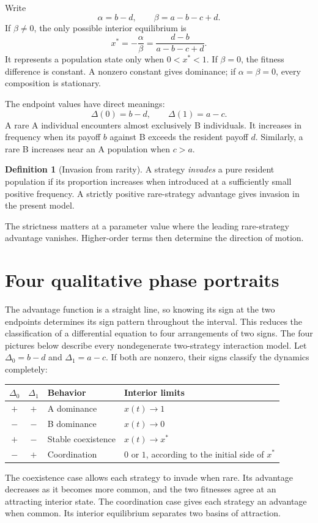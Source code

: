 \documentclass[11pt,oneside,openany]{book}
\theoremstyle{definition}
\newtheorem{definition}[theorem]{Definition}
\theoremstyle{remark}
\numberwithin{equation}{chapter}
\begin{document}
Write
\[
\alpha=b-d,\qquad\beta=a-b-c+d.
\]
If $\beta\ne0$, the only possible interior equilibrium is
\begin{equation}\label{eq:interioreq}
x^*=-\frac{\alpha}{\beta}=\frac{d-b}{a-b-c+d}.
\end{equation}
It represents a population state only when $0<x^*<1$. If $\beta=0$, the fitness difference is constant. A nonzero constant gives dominance; if $\alpha=\beta=0$, every composition is stationary.

The endpoint values have direct meanings:
\[
\Delta(0)=b-d,\qquad \Delta(1)=a-c.
\]
A rare A individual encounters almost exclusively B individuals. It increases in frequency when its payoff $b$ against B exceeds the resident payoff $d$. Similarly, a rare B increases near an A population when $c>a$.

\begin{definition}[Invasion from rarity]
A strategy \emph{invades} a pure resident population if its proportion increases when introduced at a sufficiently small positive frequency. A strictly positive rare-strategy advantage gives invasion in the present model.
\end{definition}

The strictness matters at a parameter value where the leading rare-strategy advantage vanishes. Higher-order terms then determine the direction of motion.

\section{Four qualitative phase portraits}
The advantage function is a straight line, so knowing its sign at the two endpoints determines its sign pattern throughout the interval. This reduces the classification of a differential equation to four arrangements of two signs. The four pictures below describe every nondegenerate two-strategy interaction model.
Let $\Delta_0=b-d$ and $\Delta_1=a-c$. If both are nonzero, their signs classify the dynamics completely:
\begin{center}
\begin{tabular}{@{}ccL{.31\textwidth}L{.28\textwidth}@{}}
\toprule
$\Delta_0$ & $\Delta_1$ & Behavior & Interior limits\\\midrule
$+$ & $+$ & A dominance & $x(t)\to1$\\
$-$ & $-$ & B dominance & $x(t)\to0$\\
$+$ & $-$ & Stable coexistence & $x(t)\to x^*$\\
$-$ & $+$ & Coordination & $0$ or $1$, according to the initial side of $x^*$\\
\bottomrule
\end{tabular}
\end{center}
The coexistence case allows each strategy to invade when rare. Its advantage decreases as it becomes more common, and the two fitnesses agree at an attracting interior state. The coordination case gives each strategy an advantage when common. Its interior equilibrium separates two basins of attraction.
\end{document}
